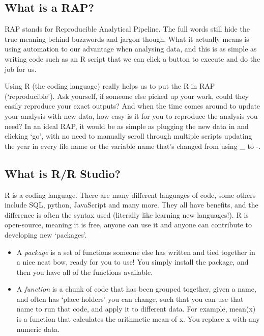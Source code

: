 \documentclass[
  12pt,
]{article}
\begin{document}
\hypertarget{what-is-a-rap}{%
\subsection{What is a RAP?}\label{what-is-a-rap}}

RAP stands for Reproducible Analytical Pipeline. The full words still
hide the true meaning behind buzzwords and jargon though. What it
actually means is using automation to our advantage when analysing data,
and this is as simple as writing code such as an R script that we can
click a button to execute and do the job for us.

Using R (the coding language) really helps us to put the R in RAP
(`reproducible'). Ask yourself, if someone else picked up your work,
could they easily reproduce your exact outputs? And when the time comes
around to update your analysis with new data, how easy is it for you to
reproduce the analysis you need? In an ideal RAP, it would be as simple
as plugging the new data in and clicking `go', with no need to manually
scroll through multiple scripts updating the year in every file name or
the variable name that's changed from using \_ to -.

\hypertarget{what-is-rr-studio}{%
\subsection{What is R/R Studio?}\label{what-is-rr-studio}}

R is a coding language. There are many different languages of code, some
others include SQL, python, JavaScript and many more. They all have
benefits, and the difference is often the syntax used (literally like
learning new languages!). R is open-source, meaning it is free, anyone
can use it and anyone can contribute to developing new `packages'.

\begin{itemize}
\item
  A \emph{package} is a set of functions someone else has written and
  tied together in a nice neat bow, ready for you to use! You simply
  install the package, and then you have all of the functions available.
\item
  A \emph{function} is a chunk of code that has been grouped together,
  given a name, and often has `place holders' you can change, such that
  you can use that name to run that code, and apply it to different
  data. For example, mean(x) is a function that calculates the
  arithmetic mean of x. You replace x with any numeric data.
\end{itemize}
\end{document}
